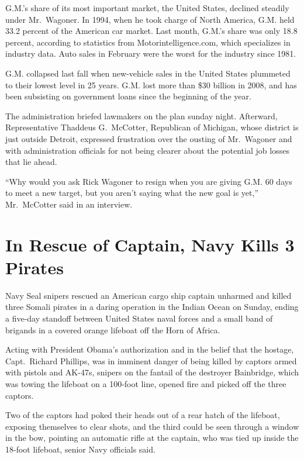 \documentclass[12pt,a4paper,onecolumn]{article}
\begin{document}
G.M.'s share of its most important market, the United States, declined steadily under Mr.~Wagoner.
In 1994, when he took charge of North America, G.M. held 33.2 percent of the American car market.
Last month, G.M.'s share was only 18.8 percent, according to statistics from Motorintelligence.com,
which specializes in industry data. Auto sales in February were the worst for the industry since
1981.

G.M. collapsed last fall when new-vehicle sales in the United States plummeted to their lowest level
in 25 years. G.M. lost more than \$30 billion in 2008, and has been subsisting on government loans
since the beginning of the year.

The administration briefed lawmakers on the plan sunday night. Afterward, Representative Thaddeus
G.~McCotter, Republican of Michigan, whose district is just outside Detroit, expressed frustration
over the ousting of Mr.~Wagoner and with administration officials for not being clearer about the
potential job losses that lie ahead.

``Why would you ask Rick Wagoner to resign when you are giving G.M. 60 days to meet a new target,
but you aren't saying what the new goal is yet,'' Mr.~McCotter said in an interview.

\section{In Rescue of Captain, Navy Kills 3 Pirates}

Navy Seal snipers rescued an American cargo ship captain unharmed and killed three Somali pirates in
a daring operation in the Indian Ocean on Sunday, ending a five-day standoff between United States
naval forces and a small band of brigands in a covered orange lifeboat off the Horn of Africa.

Acting with President Obama's authorization and in the belief that the hostage, Capt.~Richard
Phillips, was in imminent danger of being killed by captors armed with pistols and AK-47s, snipers
on the fantail of the destroyer Bainbridge, which was towing the lifeboat on a 100-foot line, opened
fire and picked off the three captors.

Two of the captors had poked their heads out of a rear hatch of the lifeboat, exposing themselves to
clear shots, and the third could be seen through a window in the bow, pointing an automatic rifle at
the captain, who was tied up inside the 18-foot lifeboat, senior Navy officials said.
\end{document}
